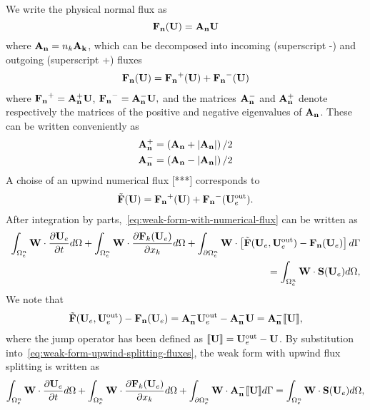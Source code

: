 We write the physical normal flux as
$$
\mathbf{\mathbf{F}_n}(\mathbf{U}) = \mathbf{A}_\mathbf{n} \mathbf{U}
$$
where $\mathbf{A}_\mathbf{n} = n_{k} \mathbf{A}_\mathbf{k}$, which can be decomposed into incoming
(superscript -) and outgoing (superscript +) fluxes
\begin{align}
\mathbf{\mathbf{F}_n}(\mathbf{U}) = \mathbf{\mathbf{F}_n}^+(\mathbf{U}) + \mathbf{\mathbf{F}_n}^-(\mathbf{U})
\label{eq:phys-flux-splitting}
\end{align}
where $ \mathbf{\mathbf{F}_n}^+ = \mathbf{A}_\mathbf{n}^{+} \mathbf{U}$, $\mathbf{\mathbf{F}_n}^- = \mathbf{A}_\mathbf{n}^{-} \mathbf{U}, $ and the matrices $\mathbf{A}_\mathbf{n}^{-}$ and $\mathbf{A}_\mathbf{n}^{+}$ denote respectively the matrices of the positive and negative eigenvalues of $\mathbf{A}_\mathbf{n}$. These can be written conveniently as
\begin{align}
  \label{eq:AnMinus-AnPlus-Definition}
\mathbf{A}_\mathbf{n}^{+} &= \left( \mathbf{A}_\mathbf{n} + \left| \mathbf{A}_\mathbf{n} \right| \right) / 2   \\
\mathbf{A}_\mathbf{n}^{-} &= \left( \mathbf{A}_\mathbf{n} - \left| \mathbf{A}_\mathbf{n} \right| \right) / 2
\end{align}
A choise of an upwind numerical flux [***] corresponds to
\begin{align}
\tilde{\mathbf{F}}(\mathbf{U}) = \mathbf{\mathbf{F}_n}^+(\mathbf{U}) + \mathbf{\mathbf{F}_n}^-(\mathbf{U}_e^{\textrm{out}}).
\label{eq:num-flux-splitting}
\end{align}
After integration by parts,~\eqref{eq:weak-form-with-numerical-flux} can be written as
\begin{align*}
\int_{\Omega_e^{n}} \mathbf{W} \cdot \frac{\partial \mathbf{U}_e}{\partial t} d\Omega  + \int_{\Omega_e^{n}} \mathbf{W} \cdot \frac{\partial \mathbf{F}_{k}(\mathbf{U}_e)}{\partial x_{k}} d\Omega + \int_{\partial \Omega_e^{n}} \mathbf{W} \cdot \left[ \tilde{\mathbf{F}}(\mathbf{U}_e,\mathbf{U}_e^{\textrm{out}}) - \mathbf{\mathbf{F}_n}(\mathbf{U}_e) \right] d\Gamma \\
= \int_{\Omega_e^{n}} \mathbf{W}  \cdot \mathbf{S}(\mathbf{U}_e) d\Omega,
\label{eq:weak-form-upwind-splitting-fluxes}
\end{align*}
We note that %
\begin{align*}
  \tilde{\mathbf{F}}(\mathbf{U}_e,\mathbf{U}_e^{\textrm{out}}) - \mathbf{\mathbf{F}_n}(\mathbf{U}_e) = \mathbf{A}_\mathbf{n}^{-} \mathbf{U}_e^{\textrm{out}} - \mathbf{A}_\mathbf{n}^{-} \mathbf{U} = \mathbf{A}_\mathbf{n}^{-} \llbracket \mathbf{U} \rrbracket,
\end{align*}
where the jump operator has been defined as $\llbracket \mathbf{U} \rrbracket = \mathbf{U}_e^{\textrm{out}} - \mathbf{U}$. By substitution into~\eqref{eq:weak-form-upwind-splitting-fluxes}, the weak form with upwind flux splitting is written as
\begin{equation}
\int_{\Omega_e^{n}} \mathbf{W} \cdot \frac{\partial \mathbf{U}_e}{\partial t} d\Omega  + \int_{\Omega_e^{n}} \mathbf{W} \cdot \frac{\partial \mathbf{F}_{k}(\mathbf{U}_e)}{\partial x_{k}} d\Omega + \int_{\partial \Omega_e^{n}} \mathbf{W} \cdot \mathbf{A}_\mathbf{n}^{-} \llbracket \mathbf{U} \rrbracket d\Gamma = \int_{\Omega_e^{n}} \mathbf{W}  \cdot \mathbf{S}(\mathbf{U}_e) d\Omega,
\label{eq:weak-form-final}
\end{equation}


